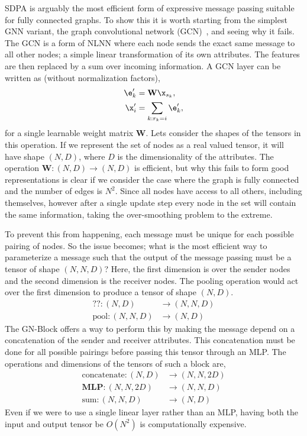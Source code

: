 SDPA is arguably the most efficient form of expressive message passing suitable for fully connected graphs.
To show this it is worth starting from the simplest GNN variant, the graph convolutional network (GCN)~, and seeing why it fails.
The GCN is a form of NLNN where each node sends the exact same message to all other nodes; a simple linear transformation of its own attributes.
The features are then replaced by a sum over incoming information.
A GCN layer can be written as (without normalization factors),
\begin{equation}
    \begin{aligned}
    \e_k' &= \mathbf{W} \x_{s_k}, \\
    \x_i' &= \sum_{k:r_k=i} \e_k',
    \end{aligned}
\end{equation}
for a single learnable weight matrix $\mathbf{W}$.
Lets consider the shapes of the tensors in this operation.
If we represent the set of nodes as a real valued tensor, it will have shape $(N, D)$, where $D$ is the dimensionality of the attributes.
The operation $\mathbf{W}: (N, D) \rightarrow (N, D)$ is efficient, but why this fails to form good representations is clear if we consider the case where the graph is fully connected and the number of edges is $N^2$.
Since all nodes have access to all others, including themselves, however after a single update step every node in the set will contain the same information, taking the over-smoothing problem to the extreme.

To prevent this from happening, each message must be unique for each possible pairing of nodes.
So the issue becomes; what is the most efficient way to parameterize a message such that the output of the message passing must be a tensor of shape $(N, N, D)$?
Here, the first dimension is over the sender nodes and the second dimension is the receiver nodes.
The pooling operation would act over the first dimension to produce a tensor of shape $(N, D)$.
\begin{align}
    \text{??}: (N, D) & \rightarrow (N, N, D) \\
    \text{pool}: (N, N, D) & \rightarrow (N, D)
\end{align}
The GN-Block offers a way to perform this by making the message depend on a concatenation of the sender and receiver attributes.
This concatenation must be done for all possible pairings before passing this tensor through an MLP.
The operations and dimensions of the tensors of such a block are,
\begin{align}
    \text{concatenate}: (N, D) & \rightarrow (N, N, 2D) \\
    \mathbf{MLP}: (N, N, 2D) & \rightarrow (N, N, D) \\
    \text{sum}: (N, N, D) & \rightarrow (N, D)
\end{align}
Even if we were to use a single linear layer rather than an MLP, having both the input and output tensor be $O(N^2)$ is computationally expensive.

